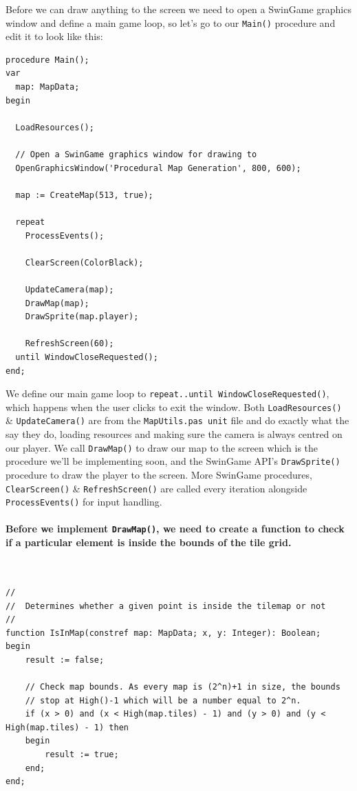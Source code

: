 \documentclass{article}
\begin{document}
Before we can draw anything to the screen we need to open a SwinGame graphics window and define a main game loop, so let's go to our \texttt{Main()} procedure and edit it to look like this:

\begin{verbatim}
procedure Main();
var
  map: MapData;
begin

  LoadResources();
  
  // Open a SwinGame graphics window for drawing to
  OpenGraphicsWindow('Procedural Map Generation', 800, 600);
  
  map := CreateMap(513, true);

  repeat
    ProcessEvents();

    ClearScreen(ColorBlack);
    
    UpdateCamera(map);
    DrawMap(map);
    DrawSprite(map.player);

    RefreshScreen(60);
  until WindowCloseRequested();
end;
\end{verbatim}

We define our main game loop to \texttt{repeat..until WindowCloseRequested()}, which happens when the user clicks to exit the window. Both \texttt{LoadResources()} \& \texttt{UpdateCamera()} are from the \texttt{MapUtils.pas unit} file and do exactly what the say they do, loading resources and making sure the camera is always centred on our player. We call \texttt{DrawMap()} to draw our map to the screen which is the procedure we'll be implementing soon, and the SwinGame API's \texttt{DrawSprite()} procedure to draw the player to the screen. More SwinGame procedures, \texttt{ClearScreen()} \& \texttt{RefreshScreen()} are called every iteration alongside \texttt{ProcessEvents()} for input handling.

\paragraph{Before we implement \texttt{DrawMap()}, we need to create a function to check if a particular element is inside the bounds of the tile grid.} \

\begin{mdframed}[backgroundcolor=darkgray]
\begin{verbatim}
//
//	Determines whether a given point is inside the tilemap or not
//
function IsInMap(constref map: MapData; x, y: Integer): Boolean;
begin
	result := false;

	// Check map bounds. As every map is (2^n)+1 in size, the bounds
	// stop at High()-1 which will be a number equal to 2^n.
	if (x > 0) and (x < High(map.tiles) - 1) and (y > 0) and (y < High(map.tiles) - 1) then
	begin
		result := true;
	end;
end;
\end{verbatim}
\end{mdframed}
\end{document}

